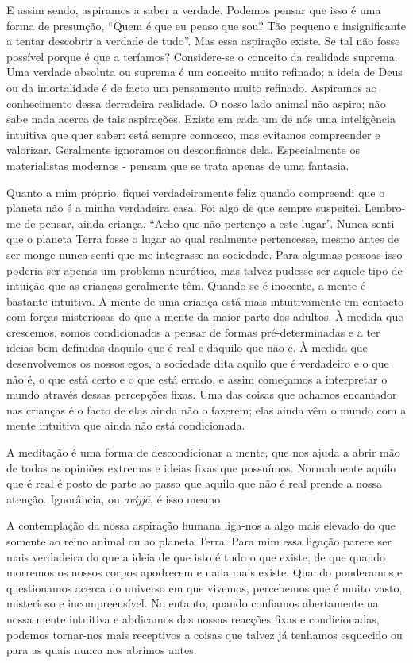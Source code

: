 E assim sendo, aspiramos a saber a verdade. Podemos pensar que isso é uma forma
de presunção, “Quem é que eu penso que sou? Tão pequeno e insignificante a
tentar descobrir a verdade de tudo”. Mas essa aspiração existe. Se tal não fosse
possível porque é que a teríamos? Considere-se o conceito da realidade suprema.
Uma verdade absoluta ou suprema é um conceito muito refinado; a ideia de Deus ou
da imortalidade é de facto um pensamento muito refinado. Aspiramos ao
conhecimento dessa derradeira realidade. O nosso lado animal não aspira; não
sabe nada acerca de tais aspirações. Existe em cada um de nós uma inteligência
intuitiva que quer saber: está sempre connosco, mas evitamos compreender e
valorizar. Geralmente ignoramos ou desconfiamos dela. Especialmente os
materialistas modernos - pensam que se trata apenas de uma fantasia.

Quanto a mim próprio, fiquei verdadeiramente feliz quando compreendi que o
planeta não é a minha verdadeira casa. Foi algo de que sempre suspeitei.
Lembro-me de pensar, ainda criança, “Acho que não pertenço a este lugar”. Nunca
senti que o planeta Terra fosse o lugar ao qual realmente pertencesse, mesmo
antes de ser monge nunca senti que me integrasse na sociedade. Para algumas
pessoas isso poderia ser apenas um problema neurótico, mas talvez pudesse ser
aquele tipo de intuição que as crianças geralmente têm. Quando se é inocente, a
mente é bastante intuitiva. A mente de uma criança está mais intuitivamente em
contacto com forças misteriosas do que a mente da maior parte dos adultos. À
medida que crescemos, somos condicionados a pensar de formas pré-determinadas e
a ter ideias bem definidas daquilo que é real e daquilo que não é. À medida que
desenvolvemos os nossos egos, a sociedade dita aquilo que é verdadeiro e o que
não é, o que está certo e o que está errado, e assim começamos a interpretar o
mundo através dessas percepções fixas. Uma das coisas que achamos encantador nas
crianças é o facto de elas ainda não o fazerem; elas ainda vêm o mundo com a
mente intuitiva que ainda não está condicionada.

A meditação é uma forma de descondicionar a mente, que nos ajuda a abrir mão de
todas as opiniões extremas e ideias fixas que possuímos. Normalmente aquilo que
é real é posto de parte ao passo que aquilo que não é real prende a nossa
atenção. Ignorância, ou \emph{avijjā}, é isso mesmo.

A contemplação da nossa aspiração humana liga-nos a algo mais elevado do que
somente ao reino animal ou ao planeta Terra. Para mim essa ligação parece ser
mais verdadeira do que a ideia de que isto é tudo o que existe; de que quando
morremos os nossos corpos apodrecem e nada mais existe. Quando ponderamos e
questionamos acerca do universo em que vivemos, percebemos que é muito vasto,
misterioso e incompreensível. No entanto, quando confiamos abertamente na nossa
mente intuitiva e abdicamos das nossas reacções fixas e condicionadas, podemos
tornar-nos mais receptivos a coisas que talvez já tenhamos esquecido ou para as
quais nunca nos abrimos antes.

